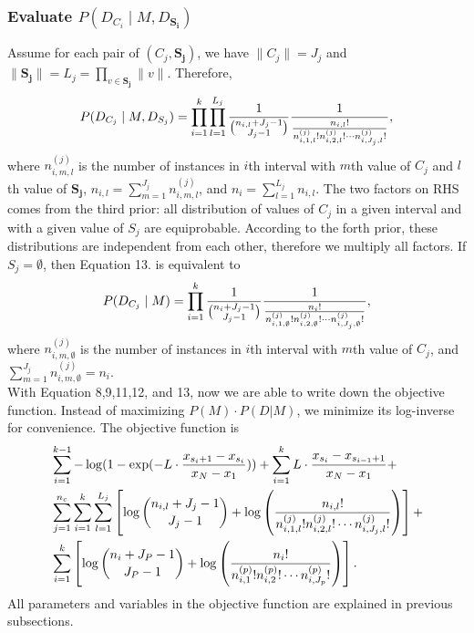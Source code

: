 \subsubsection{Evaluate $P(D_{C_i} \mid M, D_{\boldsymbol{S_i}})$}
Assume for each pair of $(C_j, \boldsymbol{S_j})$, we have $\|C_j \| = J_j$ and $\| \boldsymbol{S_j} \| = L_j = \prod_{v \in \boldsymbol{S_j}} \| v \|$. Therefore,
\begin{equation}
P(D_{C_j}  \mid M, D_{S_j}) =
\prod_{i=1}^{k} \prod_{l=1}^{L_j} {{1}\over{{n_{i,l} + J_j - 1}\choose{J_j-1}}}
{{1}\over{ {{n_{i,l}}!}\over{ {n^{(j)}_{i,1,l} !} {n^{(j)}_{i,2,l} !} \cdots {n^{(j)}_{i,J_j,l} !}}  }},
\end{equation}
where $n^{(j)}_{i,m,l}$ is the number of instances in $i$th interval with $m$th value of $C_j$ and $l$th value of $\boldsymbol{S_j}$, $n_{i,l} = \sum_{m=1}^{J_j} n^{(j)}_{i,m,l}$, and $n_i = \sum_{l=1}^{L_j} n_{i,l}$. The two factors on RHS comes from the third prior: all distribution of values of $C_j$ in a given interval and with a given value of $S_j$ are equiprobable. According to the forth prior, these distributions are independent from each other, therefore we multiply all factors. If $S_j = \emptyset$, then Equation 13. is equivalent to
\begin{equation}
P(D_{C_j}  \mid M) =
\prod_{i=1}^{k}  {{1}\over{{n_{i} + J_j - 1}\choose{J_j-1}}}
{{1}\over{ {{n_{i}}!}\over{ {n^{(j)}_{i,1,\emptyset} !} {n^{(j)}_{i,2,\emptyset} !} \cdots {n^{(j)}_{i,J_j,\emptyset} !}}  }},
\end{equation}
where $n^{(j)}_{i,m,\emptyset}$ is the number of instances in $i$th interval with $m$th value of $C_j$, and $\sum_{m=1}^{J_j} n^{(j)}_{i,m,\emptyset} = n_i$. \\

With Equation 8,9,11,12, and 13, now we are able to write down the objective function. Instead of maximizing $P(M) \cdot P(D|M)$, we minimize its log-inverse for convenience. The objective function is
\begin{equation}
\begin{aligned}
& \sum_{i=1}^{k-1} - \log(1 - {\exp(- L \cdot {{x_{s_i+1} - x_{s_i}}\over{x_N - x_1}})}) +  \sum_{i=1}^{k} L \cdot {{x_{s_{i}} - x_{s_{i-1} + 1}}\over{x_N - x_1}} +\\
&  \sum_{j=1}^{n_c} \sum_{i=1}^{k}  \sum_{l=1}^{L_j} \left[  \log{{n_{i,l} + J_j - 1}\choose{J_j-1}} + \log \left( { {{n_{i,l}}!}\over{ {n^{(j)}_{i,1,l} !} {n^{(j)}_{i,2,l} !} \cdots {n^{(j)}_{i,J_j,l} !}} } \right) \right] + \\
& \sum_{i=1}^k \left[  \log {{n_{i} + J_P - 1}\choose{J_P-1}} + \log \left( { {{n_i}!}\over{ {n^{(p)}_{i,1} !} {n^{(p)}_{i,2} !} \cdots {n^{(p)}_{i,J_p} !}} } \right) \right].
\end{aligned}
\end{equation}
All parameters and variables in the objective function are explained in previous subsections.
